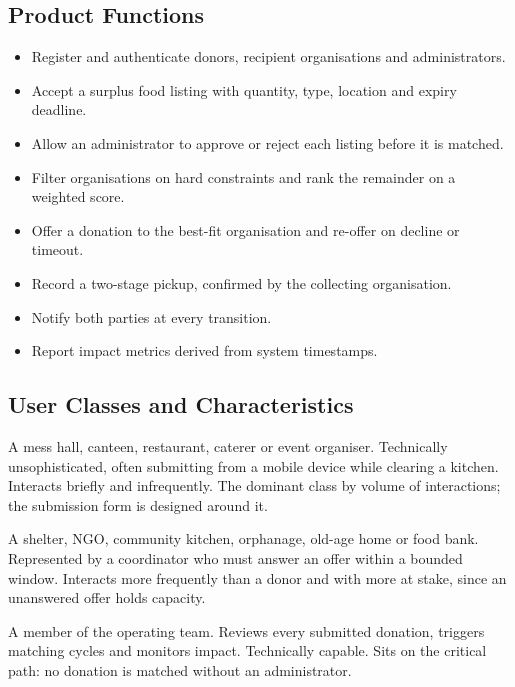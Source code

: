 \documentclass[11pt,a4paper]{article}
\newcommand{\code}[1]{\texttt{\detokenize{#1}}}
\begin{document}
\subsection{Product Functions}
\begin{itemize}
  \item Register and authenticate donors, recipient organisations and administrators.
  \item Accept a surplus food listing with quantity, type, location and expiry deadline.
  \item Allow an administrator to approve or reject each listing before it is matched.
  \item Filter organisations on hard constraints and rank the remainder on a weighted score.
  \item Offer a donation to the best-fit organisation and re-offer on decline or timeout.
  \item Record a two-stage pickup, confirmed by the collecting organisation.
  \item Notify both parties at every transition.
  \item Report impact metrics derived from system timestamps.
\end{itemize}

\subsection{User Classes and Characteristics}
\begin{description}[leftmargin=0pt,style=nextline,font=\normalfont\bfseries]
  \item[Donor \rm(\code{DONOR})]
    A mess hall, canteen, restaurant, caterer or event organiser. Technically
    unsophisticated, often submitting from a mobile device while clearing a
    kitchen. Interacts briefly and infrequently. The dominant class by volume of
    interactions; the submission form is designed around it.
  \item[Recipient Organisation \rm(\code{RECIPIENT})]
    A shelter, NGO, community kitchen, orphanage, old-age home or food bank.
    Represented by a coordinator who must answer an offer within a bounded
    window. Interacts more frequently than a donor and with more at stake, since
    an unanswered offer holds capacity.
  \item[Administrator \rm(\code{ADMIN})]
    A member of the operating team. Reviews every submitted donation, triggers
    matching cycles and monitors impact. Technically capable. Sits on the
    critical path: no donation is matched without an administrator.
\end{description}
\end{document}
